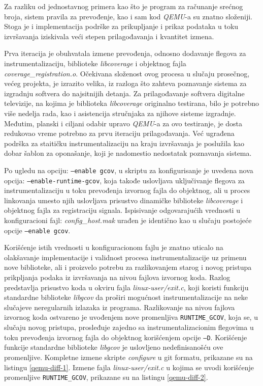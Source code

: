 \documentclass[12pt,oneside]{memoir}
\newcommand{\kod}[1]{\texttt{#1}}
\newcommand{\strano}[1]{\textit{#1}}
\begin{document}
Za razliku od jednostavnog primera kao što je program za računanje srećnog broja, sistem pravila za prevođenje, kao i sam kod \strano{QEMU}-a su znatno složeniji. Stoga je i implementacija podrške za prikupljanje i prikaz podataka u toku izvršavanja iziskivala veći stepen prilagođavanja i kvantitet izmena. 

Prva iteracija je obuhvatala izmene prevođenja, odnosno dodavanje flegova za instrumentalizaciju, biblioteke \strano{libcoverage} i objektnog fajla \strano{coverage\_registration.o}. 
Očekivana složenost ovog procesa u slučaju prosečnog, većeg projekta, je izrazito velika, iz razloga što zahteva poznavanje sistema za izgradnju softvera do najsitnijih detanja. Za prilagođavanje softvera digitalne televizije, na kojima je biblioteka \strano{libcoverage} originalno testirana, bilo je potrebno više nedelja rada, kao i asistencija stručnjaka za njihove sisteme izgradnje. Međutim, planski i ciljani odabir upravo \strano{QEMU}-a za ovo testiranje, je dosta redukovao vreme potrebno za prvu iteraciju prilagođavanja. Već ugrađena podrška za staitičku instrumentalizaciju na kraju izvršavanja je poslužila kao dobar šablon za oponašanje, koji je nadomestio nedostatak poznavanja sistema. 

Po ugledu na opciju: \kod{--enable gcov}, u skriptu za konfigurisanje je uvedena nova opcija: \kod{--enable-runtime-gcov}, koja takođe uslovljava uključivanje flegova za instrumentalizaciju u toku prevođenja izvornog fajla do objektnog, ali u proces linkovanja umesto njih uslovljava prisustvo dinamičke biblioteke \strano{libcoverage} i objektnog fajla za registraciju signala. Ispisivanje odgovarajućih vrednosti u konfiguracioni fajl: \strano{config\_host.mak} urađen je identično kao u slučaju postojeće opcije \kod{--enable gcov}. 

Korišćenje istih vrednosti u konfiguracionom fajlu je znatno uticalo na olakšavanje implementacije i validnost procesa instrumentalizacije uz primenu nove biblioteke, ali i proizvelo potrebu za razlikovanjem starog i novog pristupa prikpljanja podaka iz izvršavanja na nivou fajlova izvornog koda. Razlog predstavlja prisustvo koda u okviru fajla \strano{linux-user/exit.c}, koji koristi funkciju standardne biblioteke \strano{libgcov} da proširi mogućnost instrumentalizacije na neke slučajeve neregularnih izlazaka iz programa. Razlikovanje na nivou fajlova izvornog koda ostvareno je uvođenjem nove promenljiva \kod{RUNTIME\_GCOV}, koja se, u slučaju novog pristupa, prosleđuje zajedno sa instrumentalizacionim flegovima u toku prevođenja izvornog fajla do objektnog korišćenjem opcije \kod{–D}. Korišćenje funkcije standardne biblioteke \strano{libgcov} je uslovljeno nedefinisanošću ove promenljive. Kompletne izmene skripte \strano{configure} u git formatu, prikazane su na listingu \ref{qemu-diff-1}. Izmene fajla \strano{linux-user/exit.c} u kojima se uvodi korišćenje promenljive \kod{RUNTIME\_GCOV}, prikazane su na listingu \ref{qemu-diff-2}. 
\end{document}

